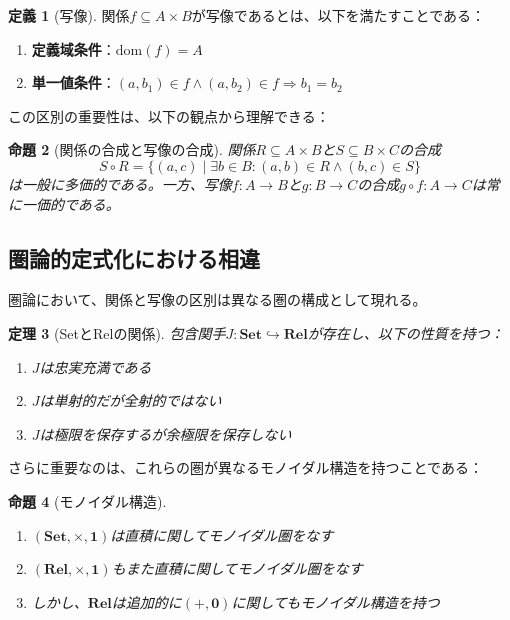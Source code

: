 \documentclass[11pt,a4paper,twocolumn]{ltjsarticle}
\theoremstyle{definition}
\newtheorem{definition}{定義}[section]
\theoremstyle{plain}
\newtheorem{theorem}[definition]{定理}
\newtheorem{proposition}[definition]{命題}
\newcommand{\Set}{\mathbf{Set}}
\newcommand{\Rel}{\mathbf{Rel}}
\begin{document}
\begin{definition}[写像]
関係$f \subseteq A \times B$が写像であるとは、以下を満たすことである：
\begin{enumerate}
\item \textbf{定義域条件}：$\mathrm{dom}(f) = A$
\item \textbf{単一値条件}：$(a, b_1) \in f \land (a, b_2) \in f \Rightarrow b_1 = b_2$
\end{enumerate}
\end{definition}

この区別の重要性は、以下の観点から理解できる：

\begin{proposition}[関係の合成と写像の合成]
関係$R \subseteq A \times B$と$S \subseteq B \times C$の合成
\[
S \circ R = \{(a, c) \mid \exists b \in B: (a, b) \in R \land (b, c) \in S\}
\]
は一般に多価的である。一方、写像$f: A \to B$と$g: B \to C$の合成$g \circ f: A \to C$は常に一価的である。
\end{proposition}

\subsection{圏論的定式化における相違}

圏論において、関係と写像の区別は異なる圏の構成として現れる。

\begin{theorem}[SetとRelの関係]
包含関手$J: \Set \hookrightarrow \Rel$が存在し、以下の性質を持つ：
\begin{enumerate}
\item $J$は忠実充満である
\item $J$は単射的だが全射的ではない
\item $J$は極限を保存するが余極限を保存しない
\end{enumerate}
\end{theorem}

さらに重要なのは、これらの圏が異なるモノイダル構造を持つことである：

\begin{proposition}[モノイダル構造]
\begin{enumerate}
\item $(\Set, \times, \mathbf{1})$は直積に関してモノイダル圏をなす
\item $(\Rel, \times, \mathbf{1})$もまた直積に関してモノイダル圏をなす
\item しかし、$\Rel$は追加的に$(+, \mathbf{0})$に関してもモノイダル構造を持つ
\end{enumerate}
\end{proposition}
\end{document}
